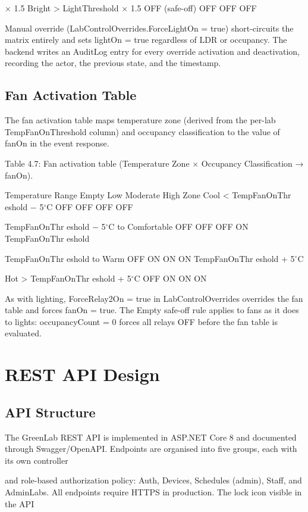 × 1.5
Bright > LightThreshold × 1.5 OFF (safe-off) OFF OFF OFF


Manual override (LabControlOverrides.ForceLightOn = true) short-circuits the matrix
entirely and sets lightOn = true regardless of LDR or occupancy. The backend writes an
AuditLog entry for every override activation and deactivation, recording the actor, the
previous state, and the timestamp.

\subsection{Fan Activation Table}


The fan activation table maps temperature zone (derived from the per-lab
TempFanOnThreshold column) and occupancy classification to the value of fanOn in the
event response.

Table 4.7: Fan activation table (Temperature Zone × Occupancy Classification → fanOn).

Temperature Range Empty Low Moderate High
Zone
Cool < TempFanOnThr eshold $-$ 5$^\circ$C OFF OFF OFF OFF

TempFanOnThr eshold $-$ 5$^\circ$C to
Comfortable OFF OFF OFF ON
TempFanOnThr eshold

TempFanOnThr eshold to
Warm OFF ON ON ON
TempFanOnThr eshold + 5$^\circ$C

Hot > TempFanOnThr eshold + 5$^\circ$C OFF ON ON ON


As with lighting, ForceRelay2On = true in LabControlOverrides overrides the fan table
and forces fanOn = true. The Empty safe-off rule applies to fans as it does to lights:
occupancyCount = 0 forces all relays OFF before the fan table is evaluated.


\section{REST API Design}


\subsection{API Structure}


The GreenLab REST API is implemented in ASP.NET Core 8 and documented through
Swagger/OpenAPI. Endpoints are organised into five groups, each with its own controller



and role-based authorization policy: Auth, Devices, Schedules (admin), Staff, and
AdminLabs. All endpoints require HTTPS in production. The lock icon visible in the API

